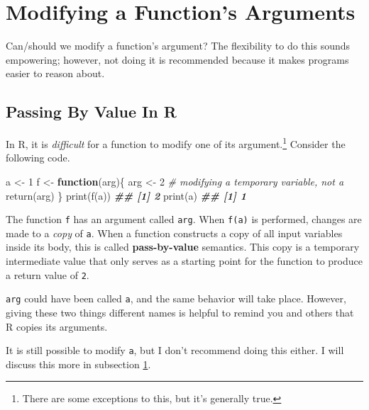 \documentclass[
  12pt,
  krantz2]{krantz}
\makeatletter
\newenvironment{Shaded}{\begin{snugshade}}{\end{snugshade}}
\newcommand{\CommentTok}[1]{\textcolor[rgb]{0.37,0.37,0.37}{\textit{#1}}}
\newcommand{\ControlFlowTok}[1]{\textcolor[rgb]{0.27,0.27,0.27}{\textbf{#1}}}
\newcommand{\DecValTok}[1]{\textcolor[rgb]{0.06,0.06,0.06}{#1}}
\newcommand{\DocumentationTok}[1]{\textcolor[rgb]{0.37,0.37,0.37}{\textbf{\textit{#1}}}}
\newcommand{\FunctionTok}[1]{\textcolor[rgb]{0,0,0}{#1}}
\newcommand{\NormalTok}[1]{#1}
\newcommand{\OtherTok}[1]{\textcolor[rgb]{0.37,0.37,0.37}{#1}}
\newenvironment{kframe}{%
\medskip{}
\setlength{\fboxsep}{.8em}
 \def\at@end@of@kframe{}%
 \ifinner\ifhmode%
  \def\at@end@of@kframe{\end{minipage}}%
  \begin{minipage}{\columnwidth}%
 \fi\fi%
 \def\FrameCommand##1{\hskip\@totalleftmargin \hskip-\fboxsep
 \colorbox{shadecolor}{##1}\hskip-\fboxsep
     \hskip-\linewidth \hskip-\@totalleftmargin \hskip\columnwidth}%
 \MakeFramed {\advance\hsize-\width
   \@totalleftmargin\z@ \linewidth\hsize
   \@setminipage}}%
 {\par\unskip\endMakeFramed%
 \at@end@of@kframe}
\renewenvironment{Shaded}{\begin{kframe}}{\end{kframe}}
\makeatother
\begin{document}
\hypertarget{modifying-a-functions-arguments}{%
\section{Modifying a Function's Arguments}\label{modifying-a-functions-arguments}}

Can/should we modify a function's argument? The flexibility to do this sounds empowering; however, not doing it is recommended because it makes programs easier to reason about.

\hypertarget{passing-by-value-in-r}{%
\subsection{Passing By Value In R}\label{passing-by-value-in-r}}

In R, it is \emph{difficult} for a function to modify one of its argument.\footnote{There are some exceptions to this, but it's generally true.} Consider the following code.

\begin{Shaded}
\begin{Highlighting}[]
\NormalTok{a }\OtherTok{\textless{}{-}} \DecValTok{1}
\NormalTok{f }\OtherTok{\textless{}{-}} \ControlFlowTok{function}\NormalTok{(arg)\{}
\NormalTok{  arg }\OtherTok{\textless{}{-}} \DecValTok{2} \CommentTok{\# modifying a temporary variable, not a}
  \FunctionTok{return}\NormalTok{(arg)}
\NormalTok{\}}
\FunctionTok{print}\NormalTok{(}\FunctionTok{f}\NormalTok{(a))}
\DocumentationTok{\#\# [1] 2}
\FunctionTok{print}\NormalTok{(a)}
\DocumentationTok{\#\# [1] 1}
\end{Highlighting}
\end{Shaded}

The function \texttt{f} has an argument called \texttt{arg}. When \texttt{f(a)} is performed, changes are made to a \emph{copy} of \texttt{a}. When a function constructs a copy of all input variables inside its body, this is called \textbf{pass-by-value} semantics. This copy is a temporary intermediate value that only serves as a starting point for the function to produce a return value of \texttt{2}.

\texttt{arg} could have been called \texttt{a}, and the same behavior will take place. However, giving these two things different names is helpful to remind you and others that R copies its arguments.

It is still possible to modify \texttt{a}, but I don't recommend doing this either. I will discuss this more in subsection \ref{modifying-a-functions-arguments}.
\end{document}
